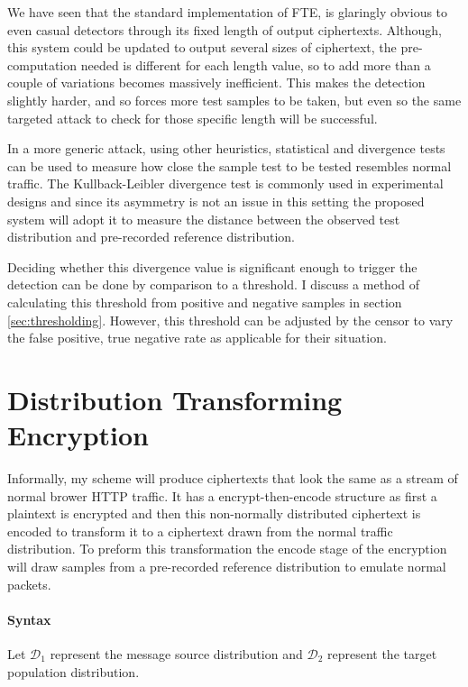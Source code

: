 \documentclass[ %
                    author={Samuel Russell},
                supervisor={Prof. Bogdan Warinschi},
                    degree={MEng},
                     title={Innocuous Ciphertexts},
                  subtitle={The DE-CENSOR Scheme},
                      type={research},
                      year={2018} ]{dissertation}
\begin{document}
We have seen that the standard implementation of FTE, is glaringly obvious to even casual detectors through its fixed length of output ciphertexts.
Although, this system could be updated to output several sizes of ciphertext, the pre-computation needed is different for each length value, so to add more than a couple of variations becomes massively inefficient.
This makes the detection slightly harder, and so forces more test samples to be taken, but even so the same targeted attack to check for those specific length will be successful.

In a more generic attack, using other heuristics, statistical and divergence tests can be used to measure how close the sample test to be tested resembles normal traffic.
The Kullback-Leibler divergence test is commonly used in experimental designs and since its asymmetry is not an issue in this setting the proposed system will adopt it to measure the distance between the observed test distribution and pre-recorded reference distribution.

Deciding whether this divergence value is significant enough to trigger the detection can be done by comparison to a threshold.
I discuss a method of calculating this threshold from positive and negative samples in section \ref{sec:thresholding}. However, this threshold can be adjusted by the censor to vary the false positive, true negative rate as applicable for their situation.


\chapter{Distribution Transforming Encryption}

Informally, my scheme will produce ciphertexts that look the same as a stream of normal brower HTTP traffic.
It has a encrypt-then-encode structure as first a plaintext is encrypted and then this non-normally distributed ciphertext is encoded to transform it to a ciphertext drawn from the normal traffic distribution.
To preform this transformation the encode stage of the encryption will draw samples from a pre-recorded reference distribution to emulate normal packets.

\subsubsection{Syntax}
Let $\mathcal{D}_1$ represent the message source distribution and $\mathcal{D}_2$ represent the target population distribution.
\end{document}
